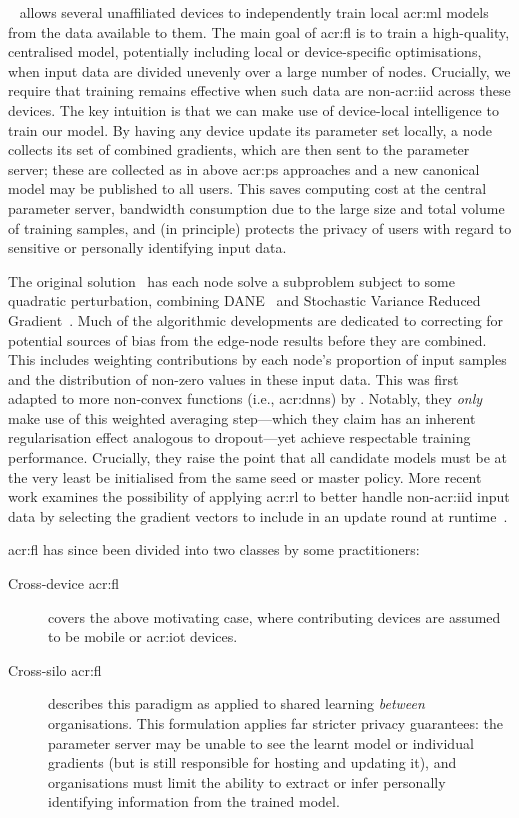 ~\parencite{DBLP:journals/corr/KonecnyMRR16,DBLP:journals/corr/Konecny17,DBLP:conf/mlsys/BonawitzEGHIIKK19} allows several unaffiliated devices to independently train local \gls{acr:ml} models from the data available to them.
The main goal of \gls{acr:fl} is to train a high-quality, centralised model, potentially including local or device-specific optimisations, when input data are divided unevenly over a large number of nodes.
Crucially, we require that training remains effective when such data are non-\gls{acr:iid} across these devices.
The key intuition is that we can make use of device-local intelligence to train our model.
By having any device update its parameter set locally, a node collects its set of combined gradients, which are then sent to the parameter server; these are collected as in above \gls{acr:ps} approaches and a new canonical model may be published to all users.
This saves computing cost at the central parameter server, bandwidth consumption due to the large size and total volume of training samples, and (in principle) protects the privacy of users with regard to sensitive or personally identifying input data.

The original solution~\parencite{DBLP:journals/corr/KonecnyMRR16} has each node solve a subproblem subject to some quadratic perturbation, combining DANE~\parencite{DBLP:conf/icml/ShamirS014} and Stochastic Variance Reduced Gradient~\parencite{DBLP:conf/nips/Johnson013}.
Much of the algorithmic developments are dedicated to correcting for potential sources of bias from the edge-node results before they are combined.
This includes weighting contributions by each node's proportion of input samples and the distribution of non-zero values in these input data.
This was first adapted to more non-convex functions (i.e., \glspl{acr:dnn}) by \textcite{DBLP:conf/aistats/McMahanMRHA17}.
Notably, they \emph{only} make use of this weighted averaging step---which they claim has an inherent regularisation effect analogous to dropout---yet achieve respectable training performance.
Crucially, they raise the point that all candidate models must be at the very least be initialised from the same seed or master policy.
More recent work examines the possibility of applying \gls{acr:rl} to better handle non-\gls{acr:iid} input data by selecting the gradient vectors to include in an update round at runtime~\parencite{DBLP:conf/infocom/WangKNL20}.

\gls{acr:fl} has since been divided into two classes by some practitioners:
\begin{description}
	\item[Cross-device \gls{acr:fl}] covers the above motivating case, where contributing devices are assumed to be mobile or \gls{acr:iot} devices.
	\item[Cross-silo \gls{acr:fl}] describes this paradigm as applied to shared learning \emph{between} organisations. This formulation applies far stricter privacy guarantees: the parameter server may be unable to see the learnt model or individual gradients (but is still responsible for hosting and updating it), and organisations must limit the ability to extract or infer personally identifying information from the trained model.
\end{description}

